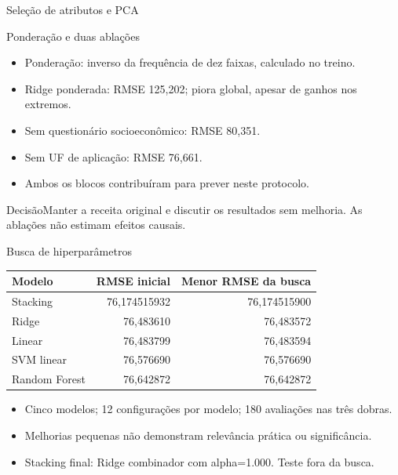 \begin{frame}{Seleção de atributos e PCA}
\end{frame}
\begin{frame}{Ponderação e duas ablações}
\begin{itemize}
\item Ponderação: inverso da frequência de dez faixas, calculado no treino.
\item Ridge ponderada: RMSE 125,202; piora global, apesar de ganhos nos extremos.
\item Sem questionário socioeconômico: RMSE 80,351.
\item Sem UF de aplicação: RMSE 76,661.
\item Ambos os blocos contribuíram para prever neste protocolo.
\end{itemize}
\begin{block}{Decisão}Manter a receita original e discutir os resultados sem melhoria. As ablações não estimam efeitos causais.\end{block}
\end{frame}
\begin{frame}{Busca de hiperparâmetros}
\centering\begin{tabular}{lrr}\toprule Modelo & RMSE inicial & Menor RMSE da busca\\\midrule
Stacking & 76,174515932 & 76,174515900\\
Ridge & 76,483610 & 76,483572\\
Linear & 76,483799 & 76,483594\\
SVM linear & 76,576690 & 76,576690\\
Random Forest & 76,642872 & 76,642872\\\bottomrule\end{tabular}
\vspace{3mm}\begin{itemize}\item Cinco modelos; 12 configurações por modelo; 180 avaliações nas três dobras.
\item Melhorias pequenas não demonstram relevância prática ou significância.
\item Stacking final: Ridge combinador com alpha=1.000. Teste fora da busca.\end{itemize}
\end{frame}
